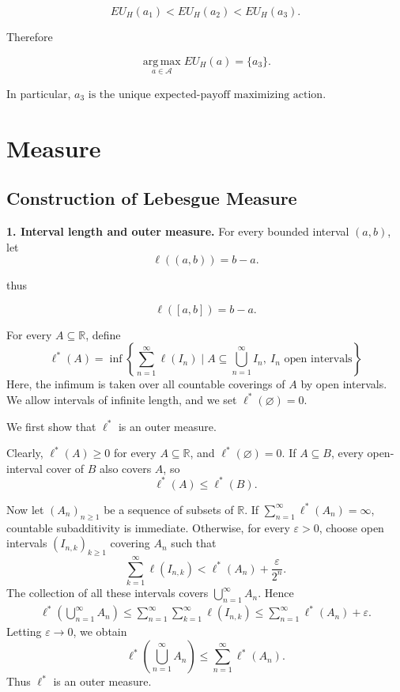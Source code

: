 \documentclass[10pt,a4paper]{book}
\begin{document}
$$
    \boxed{
        EU_H(a_1)
        <
        EU_H(a_2)
        <
        EU_H(a_3).
    }
$$

Therefore

$$
    \operatorname*{arg\,max}_{a\in\mathcal A}EU_H(a)
    =
    \{a_3\}.
$$

In particular,
$
    a_3\text{ is the unique expected-payoff maximizing action.}
$

\chapter{Measure}



\section{Construction of Lebesgue Measure}

\textbf{1. Interval length and outer measure.}
For every bounded interval $(a,b)$, let
\[
    \ell( (a,b) )=b-a.
\]

thus

\[
    \ell([a,b])=b-a.
\]

For every $A\subseteq\mathbb R$, define
\[
    \boxed{
        \ell^*(A)=
        \inf\left\{
        \sum_{n=1}^{\infty}\ell(I_n) \mid
        A\subseteq\bigcup_{n=1}^{\infty}I_n,\
        I_n\text{ open intervals}
        \right\}
    }
\]
Here, the infimum is taken over all countable coverings of $A$ by open intervals. We allow intervals of infinite length, and we set $\ell^*(\varnothing)=0$.

We first show that $\ell^*$ is an outer measure.

Clearly, $\ell^*(A)\geq0$ for every $A\subseteq\mathbb R$, and
$\ell^*(\varnothing)=0$. If $A\subseteq B$, every open-interval cover of $B$ also covers $A$, so
\[
    \ell^*(A)\leq\ell^*(B).
\]

Now let $(A_n)_{n\geq1}$ be a sequence of subsets of $\mathbb R$. If
$\sum_{n=1}^{\infty}\ell^*(A_n)=\infty$, countable subadditivity is immediate. Otherwise, for every $\varepsilon>0$, choose open intervals
$(I_{n,k})_{k\geq1}$ covering $A_n$ such that
\[
    \sum_{k=1}^{\infty}\ell(I_{n,k})
    <\ell^*(A_n)+\frac{\varepsilon}{2^n}.
\]
The collection of all these intervals covers $\bigcup_{n=1}^{\infty}A_n$. Hence
\[
    \begin{aligned}
        \ell^*\left(\bigcup_{n=1}^{\infty}A_n\right)
        \leq\sum_{n=1}^{\infty}\sum_{k=1}^{\infty}\ell(I_{n,k})
        \leq\sum_{n=1}^{\infty}\ell^*(A_n)+\varepsilon.
    \end{aligned}
\]
Letting $\varepsilon \to 0$, we obtain
\[
    \ell^*\left(\bigcup_{n=1}^{\infty}A_n\right)
    \leq\sum_{n=1}^{\infty}\ell^*(A_n).
\]
Thus $\ell^*$ is an outer measure.
\end{document}
